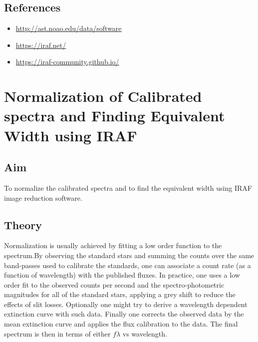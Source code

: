 \documentclass[letterpaper,11pt]{report}
\begin{document}
\section{References}
\begin{itemize}
    \item \href{http://ast.noao.edu/data/software}{http://ast.noao.edu/data/software}
    \item \href{https://iraf.net/}{https://iraf.net/}
    \item \href{https://iraf-community.github.io/}{https://iraf-community.github.io/}
\end{itemize}



\chapter{Normalization of Calibrated spectra and Finding Equivalent Width using IRAF}

\section{Aim}
To normalize the calibrated spectra and to find the equivalent width using IRAF image reduction software.

\section{Theory}
Normalization is usually achieved by fitting a low order function to the spectrum.By observing the standard
stars and summing the counts over the same band-passes used to calibrate the standards, one can associate
a count rate (as a function of wavelength) with the published fluxes. In practice, one uses a low order fit to
the observed counts per second and the spectro-photometric magnitudes for all of the standard stars, applying
a grey shift to reduce the effects of slit losses. Optionally one might try to derive a wavelength dependent
extinction curve with such data. Finally one corrects the observed data by the mean extinction curve and
applies the flux calibration to the data. The final spectrum is then in terms of either $f\lambda$ vs wavelength.
\end{document}
